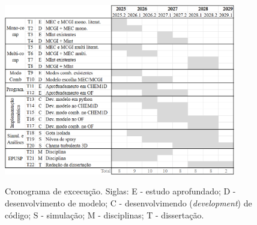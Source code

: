 \begin{figure}[ht]
    \centering
    \caption{Cronograma de excecução. Siglas: E - estudo aprofundado; D - desenvolvimento de modelo; C - desenvolvimendo (\emph{development}) de código; S - simulação; M - disciplinas; T - dissertação.}
    \includegraphics[width=0.9\textwidth]{30_images/cronograma-3.png}
    \label{fig:cronograma}
\end{figure}


